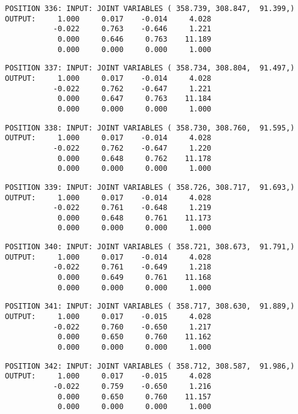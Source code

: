 \begin{verbatim}
POSITION 336: INPUT: JOINT VARIABLES ( 358.739, 308.847,  91.399,)
OUTPUT:     1.000     0.017    -0.014     4.028
           -0.022     0.763    -0.646     1.221
            0.000     0.646     0.763    11.189
            0.000     0.000     0.000     1.000
\end{verbatim} \pagebreak[1]\begin{verbatim}
POSITION 337: INPUT: JOINT VARIABLES ( 358.734, 308.804,  91.497,)
OUTPUT:     1.000     0.017    -0.014     4.028
           -0.022     0.762    -0.647     1.221
            0.000     0.647     0.763    11.184
            0.000     0.000     0.000     1.000
\end{verbatim} \pagebreak[1]\begin{verbatim}
POSITION 338: INPUT: JOINT VARIABLES ( 358.730, 308.760,  91.595,)
OUTPUT:     1.000     0.017    -0.014     4.028
           -0.022     0.762    -0.647     1.220
            0.000     0.648     0.762    11.178
            0.000     0.000     0.000     1.000
\end{verbatim} \pagebreak[1]\begin{verbatim}
POSITION 339: INPUT: JOINT VARIABLES ( 358.726, 308.717,  91.693,)
OUTPUT:     1.000     0.017    -0.014     4.028
           -0.022     0.761    -0.648     1.219
            0.000     0.648     0.761    11.173
            0.000     0.000     0.000     1.000
\end{verbatim} \pagebreak[1]\begin{verbatim}
POSITION 340: INPUT: JOINT VARIABLES ( 358.721, 308.673,  91.791,)
OUTPUT:     1.000     0.017    -0.014     4.028
           -0.022     0.761    -0.649     1.218
            0.000     0.649     0.761    11.168
            0.000     0.000     0.000     1.000
\end{verbatim} \pagebreak[1]\begin{verbatim}
POSITION 341: INPUT: JOINT VARIABLES ( 358.717, 308.630,  91.889,)
OUTPUT:     1.000     0.017    -0.015     4.028
           -0.022     0.760    -0.650     1.217
            0.000     0.650     0.760    11.162
            0.000     0.000     0.000     1.000
\end{verbatim} \pagebreak[1]\begin{verbatim}
POSITION 342: INPUT: JOINT VARIABLES ( 358.712, 308.587,  91.986,)
OUTPUT:     1.000     0.017    -0.015     4.028
           -0.022     0.759    -0.650     1.216
            0.000     0.650     0.760    11.157
            0.000     0.000     0.000     1.000
\end{verbatim} \pagebreak[1]\begin{verbatim}

\end{verbatim}
